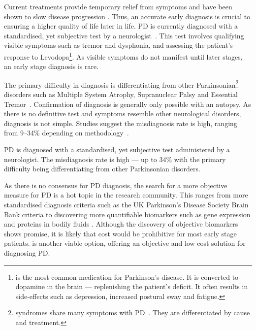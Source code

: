 \documentclass[12pt, twoside]{book}
\renewcommand\emph[1]{\textit{\color{USred}{#1}}}
\begin{document}
Current treatments provide temporary relief from symptoms and have been shown to slow disease progression \cite{slowprog1, slowprog2, slowprog3} . Thus, an accurate early diagnosis is crucial to ensuring a higher quality of life later in life. PD is currently diagnosed with a standardised, yet subjective test by a neurologist~\cite{tolosadiagnosis26}. This test involves qualifying visible symptoms such as tremor and dysphonia, and assessing the patient's response to Levodopa\footnote{\emph{Levodopa} is the most common medication for Parkinson's disease. It is converted to dopamine in the brain --- replenishing the patient's deficit. It often results in side-effects such as depression, increased postural sway and fatigue.}. As visible symptoms do not manifest until later stages, an early stage diagnosis is rare. 






The primary difficulty in diagnosis is differentiating from other Parkinsonian\footnote{\emph{Parkinsonian} syndromes share many symptoms with PD~\cite{parkinsonian}. They are differentiated by cause and treatment. } disorders such as Multiple System Atrophy, Supranuclear Palsy and Essential Tremor~\cite{hughes2002accuracy,parkinsonismdifferential1}. Confirmation of diagnosis is generally only possible with an autopsy. As there is no definitive test and symptoms resemble other neurological disorders, diagnosis is not simple. Studies suggest the misdiagnosis rate is high, ranging from 9--34\% depending on methodology~\cite{tolosadiagnosis26, brooksdiagnosis25, jankovic2000evolution}. 


\begin{highlight}[Diagnosis]
PD is diagnosed with a standardised, yet subjective test administered by a neurologist. The misdiagnosis rate is high --- up to 34\% with the primary difficulty being differentiating from other Parkinsonian disorders.
\end{highlight}

As there is no consensus for PD diagnosis, the search for a more objective measure for PD is a hot topic in the research community. This ranges from more standardised diagnosis criteria such as the UK Parkinson's Disease Society Brain Bank criteria \cite{tolosadiagnosis26,brainbank,hughesdiagnosis100} to discovering more quantifiable biomarkers such as gene expression \cite{genemarkers, genome} and proteins in bodily fluids \cite{biomarkerfluid}. Although the discovery of objective biomarkers shows promise, it is likely that cost would be prohibitive for most early stage patients. \emph{Machine learning} is another viable option, offering an objective and low cost solution for diagnosing PD.
\end{document}
